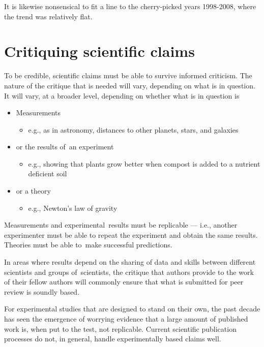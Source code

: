 \documentclass[
  10pt,
  b5paper]{book}
\providecommand{\tightlist}{%
  \setlength{\itemsep}{0pt}\setlength{\parskip}{0pt}}
\begin{document}
It is likewise nonsensical to fit a line to the cherry-picked
years 1998-2008, where the trend was relatively flat.

\hypertarget{critiquing-scientific-claims}{%
\chapter{Critiquing scientific claims}\label{critiquing-scientific-claims}}

To be credible, scientific claims must be able to survive
informed criticism. The nature of the critique that is
needed will vary, depending on what is in question.
It will vary, at a broader level, depending on whether
what is in question is

\begin{itemize}
\tightlist
\item
  Measurements

  \begin{itemize}
  \tightlist
  \item
    e.g., as in astronomy, distances to other planets,
    stars, and galaxies
  \end{itemize}
\item
  or the results of~an experiment

  \begin{itemize}
  \tightlist
  \item
    e.g., showing that plants grow better when compost is
    added to a nutrient deficient soil
  \end{itemize}
\item
  or a theory

  \begin{itemize}
  \tightlist
  \item
    e.g., Newton's law of gravity
  \end{itemize}
\end{itemize}

Measurements and experimental~results must be replicable
--- i.e., another experimenter must be able to repeat the
experiment and obtain the same results. Theories must
be able to~make successful predictions.

In areas where results depend on the sharing of data and
skills between different scientists and groups of~scientists,
the critique that authors provide to the work of their fellow
authors will commonly ensure that what is submitted for peer
review is soundly based.

For experimental studies that are designed to stand on
their own, the past decade has seen the
emergence of worrying evidence that a large amount of
published work is, when put to the test, not replicable.
Current scientific publication processes do not, in general,
handle experimentally based claims well.
\end{document}
